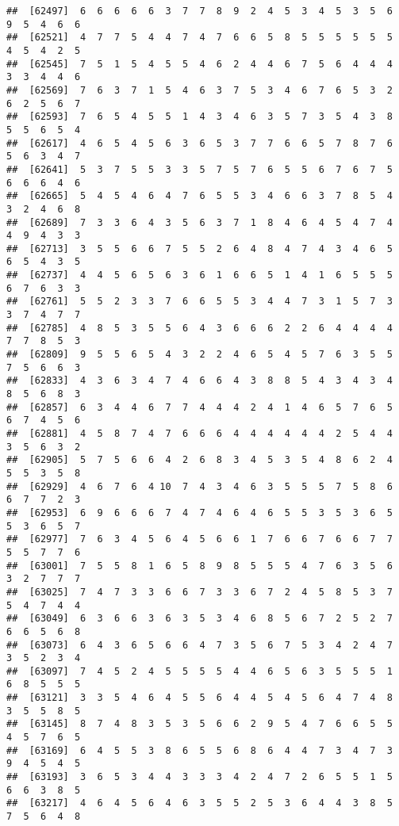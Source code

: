 \documentclass[
]{book}
\begin{document}
\begin{verbatim}
##  [62497]  6  6  6  6  6  3  7  7  8  9  2  4  5  3  4  5  3  5  6  9  5  4  6  6
##  [62521]  4  7  7  5  4  4  7  4  7  6  6  5  8  5  5  5  5  5  5  4  5  4  2  5
##  [62545]  7  5  1  5  4  5  5  4  6  2  4  4  6  7  5  6  4  4  4  3  3  4  4  6
##  [62569]  7  6  3  7  1  5  4  6  3  7  5  3  4  6  7  6  5  3  2  6  2  5  6  7
##  [62593]  7  6  5  4  5  5  1  4  3  4  6  3  5  7  3  5  4  3  8  5  5  6  5  4
##  [62617]  4  6  5  4  5  6  3  6  5  3  7  7  6  6  5  7  8  7  6  5  6  3  4  7
##  [62641]  5  3  7  5  5  3  3  5  7  5  7  6  5  5  6  7  6  7  5  6  6  6  4  6
##  [62665]  5  4  5  4  6  4  7  6  5  5  3  4  6  6  3  7  8  5  4  3  2  4  6  8
##  [62689]  7  3  3  6  4  3  5  6  3  7  1  8  4  6  4  5  4  7  4  4  9  4  3  3
##  [62713]  3  5  5  6  6  7  5  5  2  6  4  8  4  7  4  3  4  6  5  6  5  4  3  5
##  [62737]  4  4  5  6  5  6  3  6  1  6  6  5  1  4  1  6  5  5  5  6  7  6  3  3
##  [62761]  5  5  2  3  3  7  6  6  5  5  3  4  4  7  3  1  5  7  3  3  7  4  7  7
##  [62785]  4  8  5  3  5  5  6  4  3  6  6  6  2  2  6  4  4  4  4  7  7  8  5  3
##  [62809]  9  5  5  6  5  4  3  2  2  4  6  5  4  5  7  6  3  5  5  7  5  6  6  3
##  [62833]  4  3  6  3  4  7  4  6  6  4  3  8  8  5  4  3  4  3  4  8  5  6  8  3
##  [62857]  6  3  4  4  6  7  7  4  4  4  2  4  1  4  6  5  7  6  5  6  7  4  5  6
##  [62881]  4  5  8  7  4  7  6  6  6  4  4  4  4  4  4  2  5  4  4  3  5  6  3  2
##  [62905]  5  7  5  6  6  4  2  6  8  3  4  5  3  5  4  8  6  2  4  5  5  3  5  8
##  [62929]  4  6  7  6  4 10  7  4  3  4  6  3  5  5  5  7  5  8  6  6  7  7  2  3
##  [62953]  6  9  6  6  6  7  4  7  4  6  4  6  5  5  3  5  3  6  5  5  3  6  5  7
##  [62977]  7  6  3  4  5  6  4  5  6  6  1  7  6  6  7  6  6  7  7  5  5  7  7  6
##  [63001]  7  5  5  8  1  6  5  8  9  8  5  5  5  4  7  6  3  5  6  3  2  7  7  7
##  [63025]  7  4  7  3  3  6  6  7  3  3  6  7  2  4  5  8  5  3  7  5  4  7  4  4
##  [63049]  6  3  6  6  3  6  3  5  3  4  6  8  5  6  7  2  5  2  7  6  6  5  6  8
##  [63073]  6  4  3  6  5  6  6  4  7  3  5  6  7  5  3  4  2  4  7  3  5  2  3  4
##  [63097]  7  4  5  2  4  5  5  5  5  4  4  6  5  6  3  5  5  5  1  6  8  5  5  5
##  [63121]  3  3  5  4  6  4  5  5  6  4  4  5  4  5  6  4  7  4  8  3  5  5  8  5
##  [63145]  8  7  4  8  3  5  3  5  6  6  2  9  5  4  7  6  6  5  5  4  5  7  6  5
##  [63169]  6  4  5  5  3  8  6  5  5  6  8  6  4  4  7  3  4  7  3  9  4  5  4  5
##  [63193]  3  6  5  3  4  4  3  3  3  4  2  4  7  2  6  5  5  1  5  6  6  3  8  5
##  [63217]  4  6  4  5  6  4  6  3  5  5  2  5  3  6  4  4  3  8  5  7  5  6  4  8

\end{verbatim}
\end{document}
